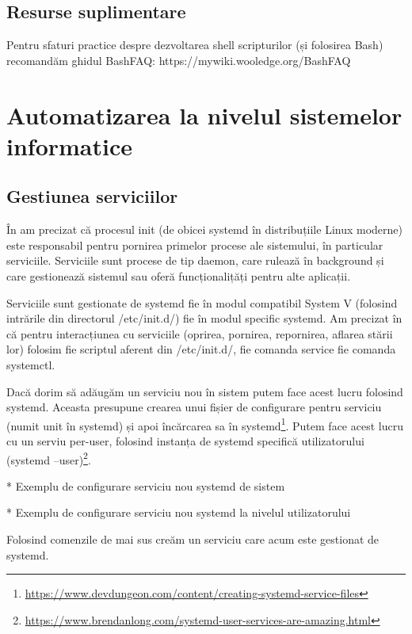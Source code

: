 \subsection{Resurse suplimentare}
\label{sec:script-advancedfunc-supl}

Pentru sfaturi practice despre dezvoltarea shell scripturilor (și folosirea
Bash) recomandăm ghidul BashFAQ: https://mywiki.wooledge.org/BashFAQ

\section{Automatizarea la nivelul sistemelor informatice}
\label{sec:script-infosys}

\subsection{Gestiunea serviciilor}
\label{sec:script-infosys-services}

În  am precizat că procesul init (de obicei
systemd în distribuțiile Linux moderne) este responsabil pentru pornirea
primelor procese ale sistemului, în particular serviciile. Serviciile sunt
procese de tip daemon, care rulează în background și care gestionează sistemul
sau oferă funcționalițăți pentru alte aplicații.

Serviciile sunt gestionate de systemd fie în modul compatibil System V (folosind
intrările din directorul /etc/init.d/) fie în modul specific systemd. Am
precizat în  că pentru interacțiunea cu
serviciile (oprirea, pornirea, repornirea, aflarea stării lor) folosim fie
scriptul aferent din /etc/init.d/, fie comanda service fie comanda systemctl.

Dacă dorim să adăugăm un serviciu nou în sistem putem face acest lucru folosind
systemd. Aceasta presupune crearea unui fișier de configurare pentru serviciu
(numit unit în systemd) și apoi încărcarea sa în
systemd\footnote{\url{https://www.devdungeon.com/content/creating-systemd-service-files}}.
Putem face acest lucru cu un serviu per-user, folosind instanța de systemd
specifică utilizatorului (systemd
--user)\footnote{\url{https://www.brendanlong.com/systemd-user-services-are-amazing.html}}.

* Exemplu de configurare serviciu nou systemd de sistem

* Exemplu de configurare serviciu nou systemd la nivelul utilizatorului

Folosind comenzile de mai sus creăm un serviciu care acum este gestionat de
systemd.

